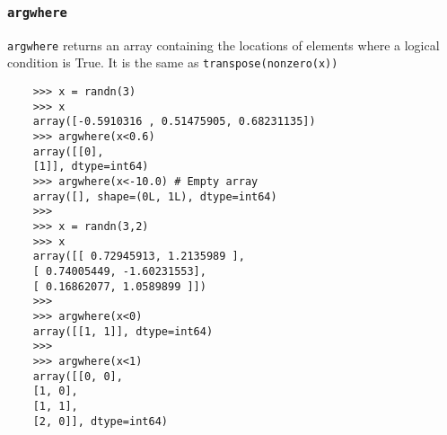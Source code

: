 \documentclass[KSmain.tex]{subfiles}
\begin{document}
\subsubsection*{\texttt{argwhere}}
\texttt{argwhere} returns an array containing the locations of elements where a logical condition is True. It is the
same as \texttt{transpose(nonzero(x))}

\begin{framed}
	\begin{verbatim}
	>>> x = randn(3)
	>>> x
	array([-0.5910316 , 0.51475905, 0.68231135])
	>>> argwhere(x<0.6)
	array([[0],
	[1]], dtype=int64)
	>>> argwhere(x<-10.0) # Empty array
	array([], shape=(0L, 1L), dtype=int64)
	>>>
	>>> x = randn(3,2)
	>>> x
	array([[ 0.72945913, 1.2135989 ],
	[ 0.74005449, -1.60231553],
	[ 0.16862077, 1.0589899 ]])
	>>>
	>>> argwhere(x<0)
	array([[1, 1]], dtype=int64)
	>>>
	>>> argwhere(x<1)
	array([[0, 0],
	[1, 0],
	[1, 1],
	[2, 0]], dtype=int64)
	
	\end{verbatim}
\end{framed}
\end{document}
